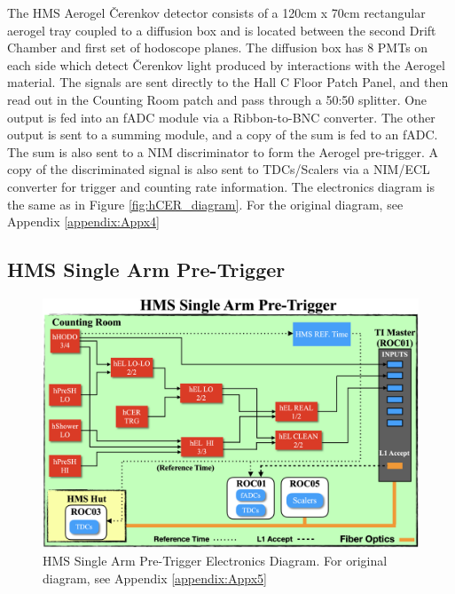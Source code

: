 \documentclass[11pt]{article}
\begin{document}
\indent The HMS Aerogel \v{C}erenkov detector consists of a 120cm x 70cm rectangular aerogel tray coupled to a diffusion box\cite{hms_aero_article} and is located
between the second Drift Chamber and first set of hodoscope planes. The diffusion box has 8 PMTs on each side
which detect \v{C}erenkov light produced by interactions with the Aerogel material. The signals are sent directly to the Hall C Floor Patch Panel, and then
read out in the Counting Room patch and pass through a 50:50 splitter. One output is fed into an fADC module via a Ribbon-to-BNC converter. The other output is
sent to a summing module, and a copy of the sum is fed to an fADC. The sum is also sent to a NIM discriminator to form the Aerogel pre-trigger.
A copy of the discriminated signal is also sent to TDCs/Scalers via a NIM/ECL converter for trigger and counting rate information.
The electronics diagram is the same as in Figure \ref{fig:hCER_diagram}. For the original diagram, see Appendix \ref{appendix:Appx4}

\newpage
\subsection{HMS Single Arm Pre-Trigger}\label{ssec:hms_single_arm_sec}
\begin{figure}[h!]
  \centering
  \includegraphics[scale=0.35]{HMS_SingleArm_diagram.png}
  \caption{HMS Single Arm Pre-Trigger Electronics Diagram. For original diagram, see Appendix \ref{appendix:Appx5}}
  \label{fig:HMS_SingleArm_diagram}
\end{figure}
\end{document}
